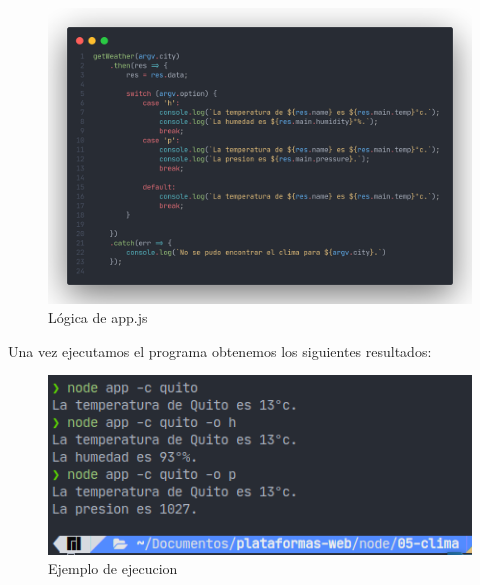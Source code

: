\documentclass[12pt]{article}
\begin{document}
\begin{figure}[H]
    \centering
    \includegraphics[scale=.22]{assets/images/app.png}
    \caption{Lógica de app.js}
\end{figure}

Una vez ejecutamos el programa obtenemos los siguientes resultados:

\begin{figure}[H]
    \centering
    \includegraphics[scale=.75]{assets/images/app-1.png}
    \caption{Ejemplo de ejecucion}
\end{figure}
\end{document}
